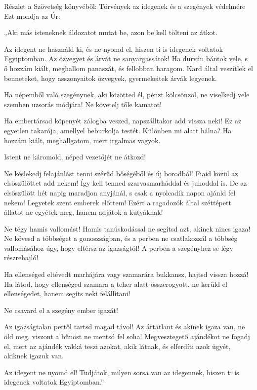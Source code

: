 \documentclass[twoside]{article}
\begin{document}
\begin{lectio}{Részlet a Szövetség könyvéből: Törvények az idegenek és a szegények védelmére}
\noindent Ezt mondja az Úr:

„Aki más isteneknek áldozatot mutat be, azon be kell tölteni az átkot.

Az idegent ne használd ki, és ne nyomd el, hiszen ti is idegenek voltatok Egyiptomban. Az özvegyet %
és árvát ne sanyargassátok! Ha durván bántok vele, s ő hozzám kiált, meghallom panaszát, és %
fellobban haragom. Kard által veszítlek el benneteket, hogy asszonyaitok özvegyek, gyermekeitek %
árvák legyenek.

Ha népemből való szegénynek, aki közötted él, pénzt kölcsönzöl, ne viselkedj vele szemben uzsorás %
módjára! Ne követelj tőle kamatot!

Ha embertársad köpenyét zálogba veszed, napszálltakor add vissza neki! Ez az egyetlen takarója, %
amellyel beburkolja testét. Különben mi alatt hálna? Ha hozzám kiált, meghallgatom, mert irgalmas %
vagyok.

Istent ne káromold, néped vezetőjét ne átkozd!

Ne késlekedj felajánlást tenni szérűd bőségéből és új borodból! Fiaid közül az elsőszülöttet add %
nekem! Így kell tenned szarvasmarháddal és juhoddal is. De az elsőszülött hét napig maradjon %
anyjánál, s csak a nyolcadik napon ajánld fel nekem! Legyetek szent emberek előttem! Ezért a %
ragadozók által széttépett állatot ne egyétek meg, hanem adjátok a kutyáknak!

Ne tégy hamis vallomást! Hamis tanúskodással ne segítsd azt, akinek nincs igaza! Ne kövesd a %
többséget a gonoszságban, és a perben ne csatlakozzál a többség vallomásához úgy, hogy eltérsz az %
igazságtól! A perben a szegényhez se légy részrehajló!

Ha ellenséged eltévedt marhájára vagy szamarára bukkansz, hajtsd vissza hozzá! Ha látod, hogy %
ellenséged szamara a teher alatt összerogyott, ne kerüld el ellenségedet, hanem segíts neki %
felállítani!

Ne csavard el a szegény ember igazát!

Az igazságtalan pertől tartsd magad távol! Az ártatlant és akinek igaza van, ne öld meg, viszont a %
bűnöst ne mentsd fel soha! Megvesztegető ajándékot ne fogadj el, mert az ajándék vakká teszi %
azokat, akik látnak, és elferdíti azok ügyét, akiknek igazuk van.

Az idegent ne nyomd el! Tudjátok, milyen sorsa van az idegennek, hiszen ti is idegenek voltatok %
Egyiptomban.”
\end{lectio}
\end{document}
